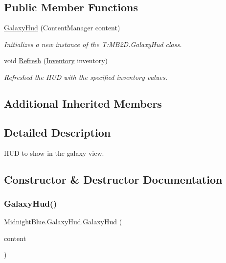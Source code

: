 \subsection*{Public Member Functions}
\begin{DoxyCompactItemize}
\item 
\hyperlink{class_midnight_blue_1_1_galaxy_hud_a6f15257e5bc5bbc67cac3888f075ea29}{Galaxy\+Hud} (Content\+Manager content)
\begin{DoxyCompactList}\small\item\em Initializes a new instance of the T\+:\+M\+B2\+D.\+Galaxy\+Hud class. \end{DoxyCompactList}\item 
void \hyperlink{class_midnight_blue_1_1_galaxy_hud_aea2d04b212188a2e729ea327b7da0449}{Refresh} (\hyperlink{class_m_b2_d_1_1_entity_component_1_1_inventory}{Inventory} inventory)
\begin{DoxyCompactList}\small\item\em Refreshed the H\+UD with the specified inventory values. \end{DoxyCompactList}\end{DoxyCompactItemize}
\subsection*{Additional Inherited Members}


\subsection{Detailed Description}
H\+UD to show in the galaxy view. 



\subsection{Constructor \& Destructor Documentation}
\hypertarget{class_midnight_blue_1_1_galaxy_hud_a6f15257e5bc5bbc67cac3888f075ea29}{}\label{class_midnight_blue_1_1_galaxy_hud_a6f15257e5bc5bbc67cac3888f075ea29} 
\subsubsection{\texorpdfstring{Galaxy\+Hud()}{GalaxyHud()}}
{\footnotesize\ttfamily Midnight\+Blue.\+Galaxy\+Hud.\+Galaxy\+Hud (\begin{DoxyParamCaption}\item[{Content\+Manager}]{content }\end{DoxyParamCaption})\hspace{0.3cm}{\ttfamily [inline]}}



